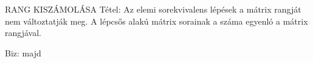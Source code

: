 \begin{tetel}{
RANG KISZÁMOLÁSA Tétel}: Az elemi sorekvivalens lépések a mátrix rangját nem változtatják meg. A lépcsős alakú mátrix sorainak a száma egyenló a mátrix rangjával.
\end{tetel}
\begin{leftbar}
Biz: majd
\end{leftbar}
